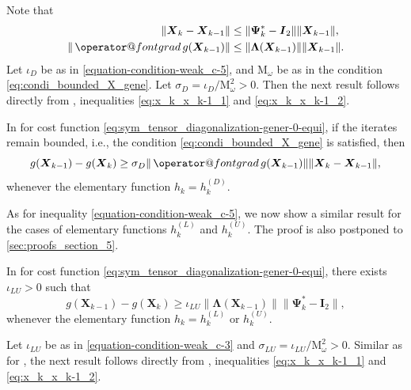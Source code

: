 \documentclass[final,onefignum,onetabnum]{siamart190516}
\makeatletter
\newcommand{\matr}[1]{\boldsymbol{#1}}
\newcommand{\ProjGrad}[2]{\mathop{{\operator@font grad} }#1(#2)}
\newcommand{\Utwo}{\Psi}
\makeatother
\begin{document}
Note that 
\begin{align}\label{eq:x_k_x_k-1_1}
\|\matr{X}_{k}-\matr{X}_{k-1}\|&\leq\|\matr{\Utwo}^{*}_{k}-\matr{I}_{2}\|\|\matr{X}_{k-1}\|,\\ \|\ProjGrad{g}{\matr{X}_{k-1}}\|&\leq\|\matr{\Lambda}(\matr{X}_{k-1})\|\|\matr{X}_{k-1}\|.\label{eq:x_k_x_k-1_2}
\end{align}
Let $\iota_{D}$ be as in \cref{equation-condition-weak_c-5}, and $\mathrm{M}_{\omega}$ be as in the condition \cref{eq:condi_bounded_X_gene}. 
Let $\sigma_{D}=\iota_{D}/\mathrm{M}_{\omega}^2>0$. 
Then the next result follows directly from , inequalities \cref{eq:x_k_x_k-1_1} and \cref{eq:x_k_x_k-1_2}. 

\begin{corollary}\label{lemma:global_rho_c}
In  for cost function \cref{eq:sym_tensor_diagonalization-gener-0-equi},
if the iterates remain bounded, i.e., the condition \cref{eq:condi_bounded_X_gene} is satisfied, then 
\begin{equation}\label{equation-condition-weak_c-5-0}
g(\matr{X}_{k-1})-g(\matr{X}_{k})\geq\sigma_{D}\|\ProjGrad{g}{\matr{X}_{k-1}}\|\|\matr{X}_{k}-\matr{X}_{k-1}\|,
\end{equation}
whenever the elementary function $h_k=h^{(D)}_{k}$. 	
\end{corollary}

As for inequality \cref{equation-condition-weak_c-5}, we now show a similar result for the cases of elementary functions $h^{(L)}_{k}$ and $h^{(U)}_k$. 
The proof is also postponed to
\cref{sec:proofs_section_5}. 

\begin{lemma}\label{lemma:global_rho_c-2-0}
In  for cost function \cref{eq:sym_tensor_diagonalization-gener-0-equi},
there exists $\iota_{LU}>0$ such that 
\begin{equation}\label{equation-condition-weak_c-3}
g(\matr{X}_{k-1})-g(\matr{X}_{k})\geq\iota_{LU}\|\matr{\Lambda}(\matr{X}_{k-1})\|\|\matr{\Utwo}^{*}_{k}-\matr{I}_{2}\|,
\end{equation}
whenever the elementary function $h_k=h^{(L)}_{k}$ or $h^{(U)}_k$. 
\end{lemma}

Let $\iota_{LU}$ be as in \cref{equation-condition-weak_c-3} and 
$\sigma_{LU}=\iota_{LU}/\mathrm{M}_{\omega}^2>0$. 
Similar as for , the next result follows directly from , inequalities \cref{eq:x_k_x_k-1_1} and \cref{eq:x_k_x_k-1_2}.  
\end{document}
